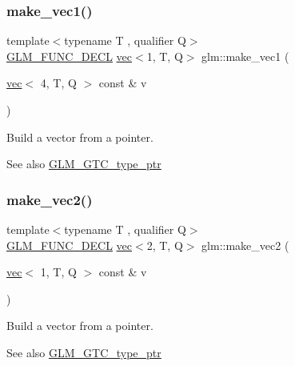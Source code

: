 \subsubsection{\texorpdfstring{make\+\_\+vec1()}{make\_vec1()}\hspace{0.1cm}{\footnotesize\ttfamily [4/4]}}
{\footnotesize\ttfamily template$<$typename T , qualifier Q$>$ \\
\mbox{\hyperlink{setup_8hpp_ab2d052de21a70539923e9bcbf6e83a51}{G\+L\+M\+\_\+\+F\+U\+N\+C\+\_\+\+D\+E\+CL}} \mbox{\hyperlink{structglm_1_1vec}{vec}}$<$1, T, Q$>$ glm\+::make\+\_\+vec1 (\begin{DoxyParamCaption}\item[{\mbox{\hyperlink{structglm_1_1vec}{vec}}$<$ 4, T, Q $>$ const \&}]{v }\end{DoxyParamCaption})\hspace{0.3cm}{\ttfamily [inline]}}

Build a vector from a pointer. \begin{DoxySeeAlso}{See also}
\mbox{\hyperlink{group__gtc__type__ptr}{G\+L\+M\+\_\+\+G\+T\+C\+\_\+type\+\_\+ptr}} 
\end{DoxySeeAlso}
\mbox{\label{group__gtc__type__ptr_ga8476d0e6f1b9b4a6193cc25f59d8a896}} 
\subsubsection{\texorpdfstring{make\+\_\+vec2()}{make\_vec2()}\hspace{0.1cm}{\footnotesize\ttfamily [1/5]}}
{\footnotesize\ttfamily template$<$typename T , qualifier Q$>$ \\
\mbox{\hyperlink{setup_8hpp_ab2d052de21a70539923e9bcbf6e83a51}{G\+L\+M\+\_\+\+F\+U\+N\+C\+\_\+\+D\+E\+CL}} \mbox{\hyperlink{structglm_1_1vec}{vec}}$<$2, T, Q$>$ glm\+::make\+\_\+vec2 (\begin{DoxyParamCaption}\item[{\mbox{\hyperlink{structglm_1_1vec}{vec}}$<$ 1, T, Q $>$ const \&}]{v }\end{DoxyParamCaption})\hspace{0.3cm}{\ttfamily [inline]}}

Build a vector from a pointer. \begin{DoxySeeAlso}{See also}
\mbox{\hyperlink{group__gtc__type__ptr}{G\+L\+M\+\_\+\+G\+T\+C\+\_\+type\+\_\+ptr}} 
\end{DoxySeeAlso}
\mbox{\label{group__gtc__type__ptr_gae54bd325a08ad26edf63929201adebc7}} 
